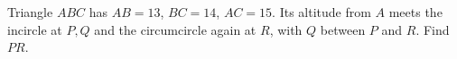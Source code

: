 Triangle $ ABC $ has $ AB=13 $, $ BC=14 $, $ AC=15 $. Its altitude from $ A $ meets the incircle at $ P,Q $ and the circumcircle again at $ R $, with $ Q $ between $ P $ and $ R $. Find $ PR $.
